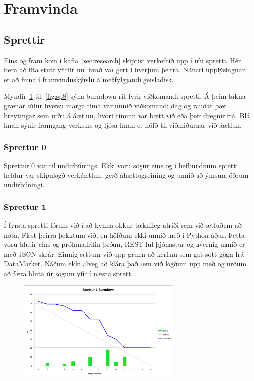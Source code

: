\documentclass{article}
\begin{document}
\section{Framvinda}
\subsection{Sprettir}
Eins og fram kom í kafla~\ref{sec:research} skiptist verkefnið upp í níu spretti. 
Hér bera að líta stutt yfirlit um hvað var gert í hverjum þeirra. Nánari upplýsingnar 
er að finna í framvinduskýrslu á meðfylgjandi geisladisk.

Myndir~\ref{fig:sp1} til~\ref{fig:sp8} 
sýna burndown rit fyrir viðkomandi spretti. Á þeim tákna grænar súlur hversu marga tíma var 
unnið viðkomandi dag og rauðar þær breytingar sem urðu á áætlun, hvort tímum var bætt við eða 
þeir dregnir frá. Blá línan sýnir framgang verksins og ljósa línan er höfð til viðmiðurnar 
við áætlun.

\subsubsection{Sprettur 0}
Sprettur 0 var til undirbúnings. Ekki voru sögur eins og í
hefbundnum spretti heldur var skipulögð verkáætlun, gerð áhættugreining og unnið að ýmsum öðrum
undirbúningi.
\subsubsection{Sprettur 1}
Í fyrsta spretti fórum við í að kynna okkur tæknileg atriði sem við ætluðum að
nota.
Flest þeirra þekktum við, en höfðum ekki unnið með í Python áður. Þetta voru hlutir
eins og prófanadrifin þróun, REST-ful þjónustur og hvernig 
unnið er með JSON skrár. Einnig settum við upp grunn að kerfinu sem gat sótt
gögn frá DataMarket. Náðum ekki alveg að klára það sem við lögðum 
upp með og urðum að færa hluta úr sögum yfir í næsta sprett.
\begin{figure}[H]
  \centering
  \includegraphics[width=0.72\textwidth]{Sprettur1_Burndown.png}
  \caption{}
  \label{fig:sp1}
\end{figure}
\end{document}
